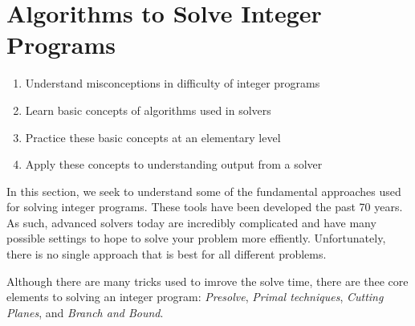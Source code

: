 
%
%

\chapter{Algorithms to Solve Integer Programs}
\label{sec:IP-algorithms}

\begin{outcome}
\begin{enumerate}
\item Understand misconceptions in difficulty of integer programs
\item Learn basic concepts of algorithms used in solvers
\item Practice these basic concepts at an elementary level
\item Apply these concepts to understanding output from a solver
\end{enumerate}
\end{outcome}

In this section, we seek to understand some of the fundamental approaches used for solving integer programs.   These tools have been developed the past 70 years.  As  such, advanced solvers today are incredibly complicated and have many possible settings to hope to solve your problem more effiently.  Unfortunately, there is no single approach that is best for all different problems.


Although there are many tricks used to imrove the solve time, there are thee core elements to solving an integer program: \emph{Presolve}, \emph{Primal techniques}, \emph{Cutting Planes}, and \emph{Branch and Bound}.   

